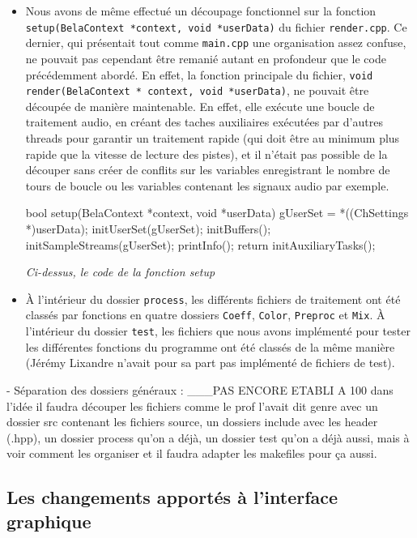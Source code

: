 \begin{itemize}
    \item Nous avons de même effectué un découpage fonctionnel sur la
      fonction \verb!setup(BelaContext *context, void *userData)! du
      fichier \verb!render.cpp!. Ce dernier, qui présentait tout comme
      \verb!main.cpp! une organisation assez confuse, ne pouvait pas
      cependant être remanié autant en profondeur que le code
      précédemment abordé. En effet, la fonction principale du
      fichier,
      \verb!void render(BelaContext * context, void *userData)!, ne
      pouvait être découpée de manière maintenable. En effet, elle
      exécute une boucle de traitement audio, en créant des taches
      auxiliaires exécutées par d'autres threads pour garantir un
      traitement rapide (qui doit être au minimum plus rapide que la
      vitesse de lecture des pistes), et il n'était pas possible de la
      découper sans créer de conflits sur les variables enregistrant
      le nombre de tours de boucle ou les variables contenant les
      signaux audio par exemple.

      \begin{lstlistings}
      bool setup(BelaContext *context, void *userData) {
        gUserSet = *((ChSettings *)userData);
        initUserSet(gUserSet);
        initBuffers();
        initSampleStreams(gUserSet);
        printInfo();
        return initAuxiliaryTasks();
      }
    \end{lstlistings}

    \begin{center}
      \textit{Ci-dessus, le code de la fonction setup}
    \end{center}    

      \item \`{A} l'intérieur du dossier \verb!process!, les
        différents fichiers de traitement ont été classés par
        fonctions en quatre dossiers \verb!Coeff!, \verb!Color!,
        \verb!Preproc! et \verb!Mix!. \`{A} l'intérieur du dossier
        \verb!test!, les fichiers que nous avons implémenté pour tester les
        différentes fonctions du programme ont été classés de la même
        manière (Jérémy Lixandre n'avait pour sa part pas implémenté
        de fichiers de test).

\end{itemize}
  - Séparation des dossiers généraux : ___PAS ENCORE ETABLI A 100%
  dans l'idée il faudra découper les fichiers comme le prof l'avait dit genre
  avec un dossier src contenant les fichiers source, un dossiers include avec
  les header (.hpp), un dossier process qu'on a déjà, un dossier test qu'on a
  déjà aussi, mais à voir comment les organiser et il faudra adapter les
  makefiles pour ça aussi.

\subsection{Les changements apportés à l'interface graphique}

